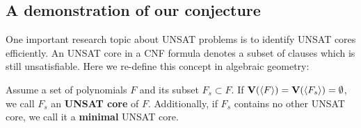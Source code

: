 \subsection{A demonstration of our conjecture}
One  important research topic about UNSAT problems is to identify UNSAT cores efficiently.
An UNSAT core in a CNF formula denotes a subset of clauses which is still unsatisfiable. Here
we re-define this concept in algebraic geometry:
\begin{Definition}
Assume a set of polynomials $F$ and its subset $F_s\subset F$. If ${\bf V}(\langle F\rangle) = {\bf V}
(\langle F_s\rangle) = \emptyset$, we call $F_s$ an {\bf UNSAT core} of $F$. Additionally, if
$F_s$ contains no other UNSAT core, we call it a {\bf minimal} UNSAT core.
\end{Definition}

